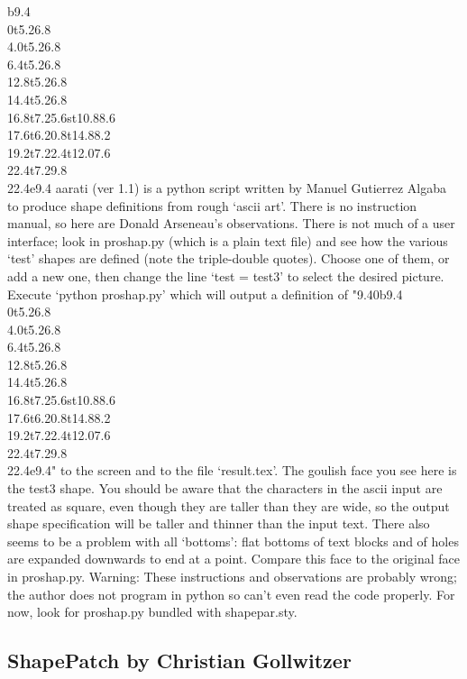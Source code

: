 \documentclass[draft]{article}
\makeatletter
\DeclareRobustCommand{\_}{%
  \ifmmode \nfss@text{\textunderscore}\else \BreakableUnderscore \fi}
\makeatother
\begin{document}
\begin{minipage}{0.2\textwidth}

\gdef\bassshape{{9.4}{0}b{9.4}
\\{0}t{5.2}{6.8}
\\{4.0}t{5.2}{6.8}
\\{6.4}t{5.2}{6.8}
\\{12.8}t{5.2}{6.8}
\\{14.4}t{5.2}{6.8}
\\{16.8}t{7.2}{5.6}st{10.8}{8.6}
\\{17.6}t{6.2}{0.8}t{14.8}{8.2}
\\{19.2}t{7.2}{2.4}t{12.0}{7.6}
\\{22.4}t{7.2}{9.8}
\\{22.4}e{9.4}}

\shapepar\bassshape
aarati (ver 1.1) is a python script written by Man\-uel
Gu\-ti\-er\-rez Al\-ga\-ba to produce shape definitions from rough
`ascii art'.  There is no instruction manual, so here are Donald
Arseneau's observations. There is not much of a user interface; look
in proshap.py (which is a plain text file) and see how the various
`test' shapes are defined (note the triple-double quotes).  Choose
one of them, or add a new one, then change the line `test = test3' to select
the desired picture.  Execute `python proshap.py' which will output a
definition of "\bassshape" to the screen and to the file `result.tex'.
The goul\-ish face you see here is the test3 shape.  You should be
aware that the characters in the ascii input are treated as square,
even though they are taller than they are wide, so the output shape
specification will be taller and thinner than the input text.  There
also seems to be a problem with all `bottoms': flat bottoms of text
blocks and of holes are expanded downwards to end at a point.  Compare
this face to the original face in proshap.py.  Warning: These
instructions and observations are probably wrong; the author does not
program in python so can't even read the code properly.  For now, look
for proshap.py bundled with shapepar.sty.
\end{minipage}

\vspace{0pt plus 5cm}
\vspace{0pt plus -5cm}
\vspace{5cm}
\vspace{-5cm}
\subsection{ShapePatch by Christian Gollwitzer}
\end{document}
